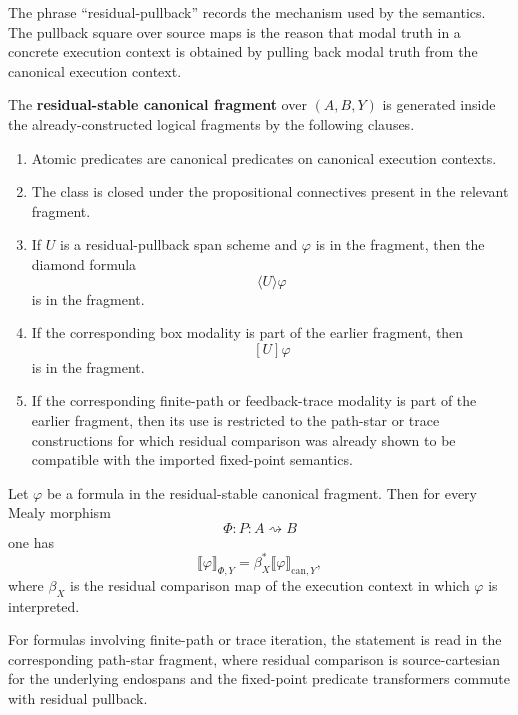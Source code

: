 The phrase ``residual-pullback'' records the mechanism used by the semantics.
The pullback square over source maps is the reason that modal truth in a
concrete execution context is obtained by pulling back modal truth from the
canonical execution context.

\begin{definition}
\label{def:residual-stable-canonical-fragment}
The \textbf{residual-stable canonical fragment} over \((A,B,Y)\) is generated
inside the already-constructed logical fragments by the following clauses.

\begin{enumerate}
  \item Atomic predicates are canonical predicates on canonical execution
  contexts.

  \item The class is closed under the propositional connectives present in
  the relevant fragment.

  \item If \(U\) is a residual-pullback span scheme and \(\varphi\) is in
  the fragment, then the diamond formula
  \[
    \langle U\rangle\varphi
  \]
  is in the fragment.

  \item If the corresponding box modality is part of the earlier fragment,
  then
  \[
    [U]\varphi
  \]
  is in the fragment.

  \item If the corresponding finite-path or feedback-trace modality is part
  of the earlier fragment, then its use is restricted to the path-star or
  trace constructions for which residual comparison was already shown to be
  compatible with the imported fixed-point semantics.
\end{enumerate}
\end{definition}

\begin{theorem}
\label{thm:canonical-pullback-semantics}
Let \(\varphi\) be a formula in the residual-stable canonical fragment.  Then
for every Mealy morphism
\[
  \Phi:P:A\rightsquigarrow B
\]
one has
\[
  \llbracket\varphi\rrbracket_{\Phi,Y}
  =
  \beta_X^*
  \llbracket\varphi\rrbracket_{\mathrm{can},Y},
\]
where \(\beta_X\) is the residual comparison map of the execution context in
which \(\varphi\) is interpreted.

For formulas involving finite-path or trace iteration, the statement is read
in the corresponding path-star fragment, where residual comparison is
source-cartesian for the underlying endospans and the fixed-point predicate
transformers commute with residual pullback.
\end{theorem}

